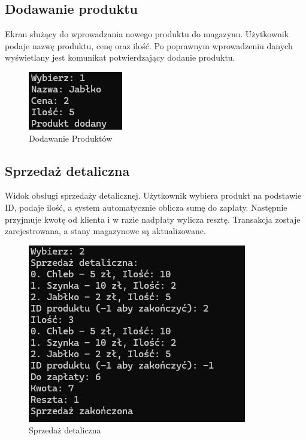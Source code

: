 \subsection{Dodawanie produktu}
Ekran służący do wprowadzania nowego produktu do magazynu. Użytkownik podaje nazwę produktu, cenę oraz ilość. Po poprawnym wprowadzeniu danych wyświetlany jest komunikat potwierdzający dodanie produktu.
\begin{figure}[ht]
    \centering
    \includegraphics[width=0.5\linewidth]{figures/Dodawanie_pr.png}
    \caption{Dodawanie Produktów}
\end{figure}

\subsection{Sprzedaż detaliczna}
Widok obsługi sprzedaży detalicznej. Użytkownik wybiera produkt na podstawie ID, podaje ilość, a system automatycznie oblicza sumę do zapłaty. Następnie przyjmuje kwotę od klienta i w razie nadpłaty wylicza resztę. Transakcja zostaje zarejestrowana, a stany magazynowe są aktualizowane.
\begin{figure}[ht]
    \centering
    \includegraphics[width=0.5\linewidth]{figures/Spr_det.png}
    \caption{Sprzedaż detaliczna}
\end{figure}

